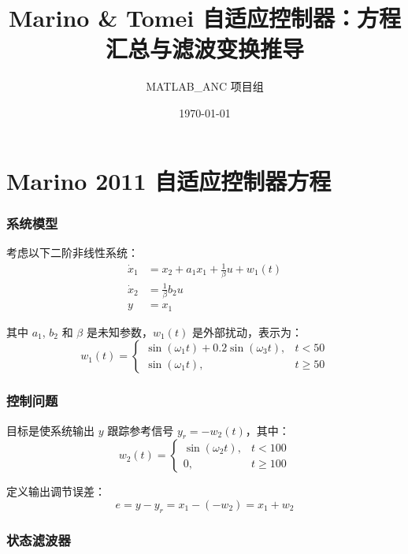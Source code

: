 \documentclass[12pt,a4paper]{article}
\title{Marino \& Tomei 自适应控制器：方程汇总与滤波变换推导}
\author{MATLAB\_ANC 项目组}
\date{\today}
\begin{document}
\maketitle
\tableofcontents
\newpage

\part{Marino 2011 自适应控制器方程}

\section{系统模型}

考虑以下二阶非线性系统：
\begin{align}
\dot{x}_1 &= x_2 + a_1 x_1 + \frac{1}{\beta}u + w_1(t) \label{eq:sys1} \\
\dot{x}_2 &= \frac{1}{\beta}b_2 u \label{eq:sys2} \\
y &= x_1 \label{eq:sys3}
\end{align}

其中 $a_1$, $b_2$ 和 $\beta$ 是未知参数，$w_1(t)$ 是外部扰动，表示为：
\begin{equation}
w_1(t) =
\begin{cases}
\sin(\omega_1 t) + 0.2\sin(\omega_3 t), & t < 50 \\
\sin(\omega_1 t), & t \geq 50
\end{cases}
\label{eq:w1}
\end{equation}

\section{控制问题}

目标是使系统输出 $y$ 跟踪参考信号 $y_r = -w_2(t)$，其中：
\begin{equation}
w_2(t) =
\begin{cases}
\sin(\omega_2 t), & t < 100 \\
0, & t \geq 100
\end{cases}
\label{eq:w2}
\end{equation}

定义输出调节误差：
\begin{equation}
e = y - y_r = x_1 - (-w_2) = x_1 + w_2
\label{eq:error}
\end{equation}

\section{状态滤波器}
\end{document}
